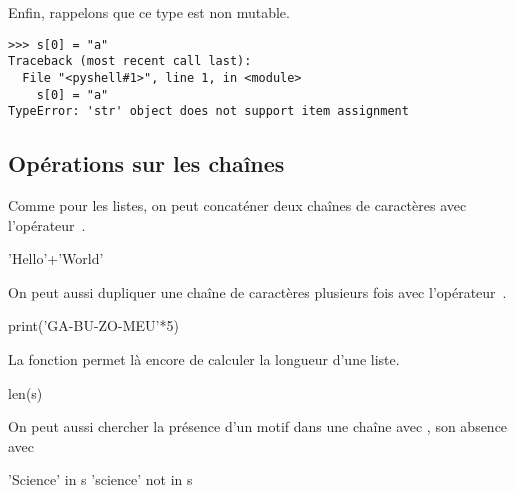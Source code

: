 Enfin, rappelons que ce type est non mutable.
\begin{verbatim}
>>> s[0] = "a"
Traceback (most recent call last):
  File "<pyshell#1>", line 1, in <module>
    s[0] = "a"
TypeError: 'str' object does not support item assignment
\end{verbatim}

\subsection{Opérations sur les chaînes}

Comme pour les listes, on peut concaténer deux chaînes de caractères avec l'opérateur~\pyv{+}.
\begin{pyconsole}
'Hello'+'World'
\end{pyconsole}
On peut aussi dupliquer une chaîne de caractères plusieurs fois avec l'opérateur~\pyv{*}.
\begin{pyconsole}
print('GA-BU-ZO-MEU\n'*5)
\end{pyconsole}
La fonction  permet là encore de calculer la longueur d'une liste.
\begin{pyconsole}
len(s)
\end{pyconsole}
On peut aussi chercher la présence d'un motif dans une chaîne avec , son absence avec 
\begin{pyconsole}
'Science' in s
'science' not in s
\end{pyconsole}



